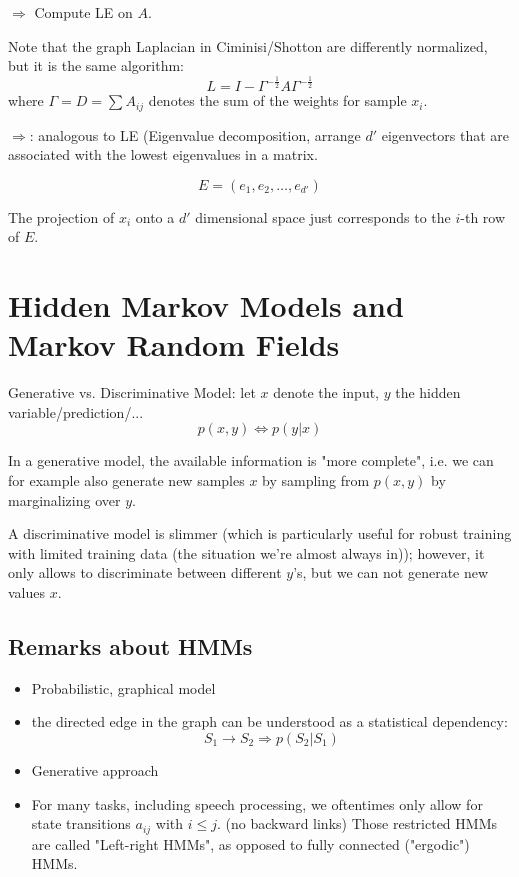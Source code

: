 \documentclass{scrartcl}
\begin{document}
\(\Rightarrow\) Compute LE on \(A\).

Note that the graph Laplacian in Ciminisi/Shotton  are differently normalized, but it is the same algorithm:
\[L = I - \Gamma^{-\frac{1}{2}} A \Gamma^{-\frac{1}{2}}\]
where \(\Gamma = D = \sum A_{ij}\) denotes the sum of the weights for sample \(x_i\).

\(\Rightarrow\): analogous to LE (Eigenvalue decomposition, arrange \(d'\) eigenvectors that are associated with the lowest eigenvalues in a matrix.

\[E = (e_1, e_2, \dots, e_{d'})\]

The projection of \(x_i\) onto a \(d'\) dimensional space just corresponds to the \(i\)-th row of \(E\).



\section{Hidden Markov Models and Markov Random Fields}
Generative vs. Discriminative Model: let \(x\) denote the input, \(y\) the hidden variable/prediction/...
\[p(x,y) \Leftrightarrow p(y|x)\]

In a generative model, the available information is "more complete", i.e. we can for example also generate new samples \(x\) by sampling from \(p(x,y)\) by marginalizing over \(y\).

A discriminative model is slimmer (which is particularly useful for robust training with limited training data (the situation we're almost always in)); however, it only allows to discriminate between different \(y\)'s, but we can not generate new values \(x\).

\subsection{Remarks about HMMs}
\begin{itemize}
    \item
        Probabilistic, graphical model
    \item
        the directed edge in the graph can be understood as a statistical dependency: \[S_1 \rightarrow S_2 \Rightarrow p(S_2|S_1)\]
    \item
        Generative approach
    \item
        For many tasks, including speech processing, we oftentimes only allow for state transitions \(a_{ij}\) with \(i \leq j\). (no backward links) Those restricted HMMs are called "Left-right HMMs", as opposed to fully connected ("ergodic") HMMs.
\end{itemize}
\end{document}
